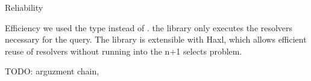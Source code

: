 \begin{frame}[allowframebreaks]
\begin{block}{Reliability}
\begin{itemize}
\end{itemize}

\end{block}

\begin{block}{Efficiency} we used the type  instead of . the library only executes the resolvers necessary for the query. The library is extensible with Haxl, which allows efficient reuse of resolvers without running into the n+1 selects problem.

\end{block}


TODO: arguzment chain,


\end{frame}
